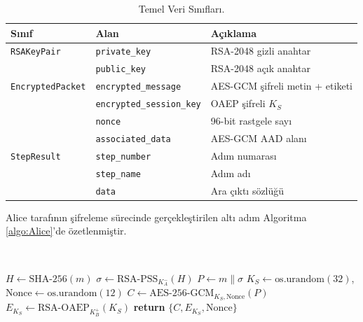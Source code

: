 \begin{table}[t]
	\caption{Temel Veri Sınıfları.}
	\centering
	\begin{tabular}{|l|l|l|}
		\hline \textbf{Sınıf} & \textbf{Alan} & \textbf{Açıklama} \\
		\hline \texttt{RSAKeyPair} & \texttt{private\_key} & RSA-2048 gizli anahtar \\
		\hline                    & \texttt{public\_key}  & RSA-2048 açık anahtar \\
		\hline \texttt{EncryptedPacket} & \texttt{encrypted\_message} & AES-GCM şifreli metin + etiketi \\
		\hline                          & \texttt{encrypted\_session\_key} & OAEP şifreli $K_S$ \\
		\hline                          & \texttt{nonce} & 96-bit rastgele sayı \\
		\hline                          & \texttt{associated\_data} & AES-GCM AAD alanı \\
		\hline \texttt{StepResult} & \texttt{step\_number} & Adım numarası \\
		\hline                     & \texttt{step\_name}   & Adım adı \\
		\hline                     & \texttt{data}         & Ara çıktı sözlüğü \\
		\hline
	\end{tabular}
	\label{tab:VeriSiniflari}
\end{table}

Alice tarafının şifreleme sürecinde gerçekleştirilen altı adım Algoritma \ref{algo:Alice}'de özetlenmiştir.

\begin{algorithm}
	~\\
	\begin{algorithmic}[H]
		\STATE $H \leftarrow \text{SHA-256}(m)$
		\STATE $\sigma \leftarrow \text{RSA-PSS}_{K^-_A}(H)$
		\STATE $P \leftarrow m \| \sigma$
		\STATE $K_S \leftarrow \text{os.urandom}(32)$, $\text{Nonce} \leftarrow \text{os.urandom}(12)$
		\STATE $C \leftarrow \text{AES-256-GCM}_{K_S, \text{Nonce}}(P)$
		\STATE $E_{K_S} \leftarrow \text{RSA-OAEP}_{K^+_B}(K_S)$
		\STATE \textbf{return} $\{C, E_{K_S}, \text{Nonce}\}$
	\end{algorithmic}
	\caption{Alice Tarafı Şifreleme Algoritması}
	~\\
	\label{algo:Alice}
\end{algorithm}

